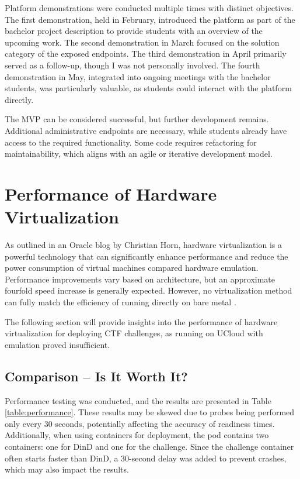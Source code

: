 Platform demonstrations were conducted multiple times with distinct objectives. The first demonstration, held in February, introduced the platform as part of the bachelor project description to provide students with an overview of the upcoming work. The second demonstration in March focused on the solution category of the exposed endpoints. The third demonstration in April primarily served as a follow-up, though I was not personally involved. The fourth demonstration in May, integrated into ongoing meetings with the bachelor students, was particularly valuable, as students could interact with the platform directly.

The MVP can be considered successful, but further development remains. Additional administrative endpoints are necessary, while students already have access to the required functionality. Some code requires refactoring for maintainability, which aligns with an agile or iterative development model.

\section{Performance of Hardware Virtualization}
As outlined in an Oracle blog by Christian Horn, hardware virtualization is a powerful technology that can significantly enhance performance and reduce the power consumption of virtual machines compared  hardware emulation. Performance improvements vary based on architecture, but an approximate fourfold speed increase is generally expected. However, no virtualization method can fully match the efficiency of running directly on bare metal \parencite{horn2025virtualization}.

The following section will provide insights into the performance of hardware virtualization for deploying CTF challenges, as running on UCloud with emulation proved insufficient.

\subsection{Comparison -- Is It Worth It?}
Performance testing was conducted, and the results are presented in Table \ref{table:performance}. These results may be skewed due to probes being performed only every 30 seconds, potentially affecting the accuracy of readiness times. Additionally, when using containers for deployment, the pod contains two containers: one for DinD and one for the challenge. Since the challenge container often starts faster than DinD, a 30-second delay was added to prevent crashes, which may also impact the results.

